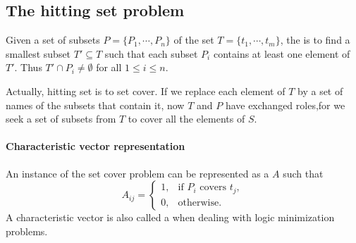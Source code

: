 \documentclass{note}
\begin{document}
\subsection{The hitting set problem}
\begin{definition}
Given a set of subsets $P = \{P_1, \cdots, P_n\}$ of the
set $T = \{t_1, \cdots, t_m\}$, the  is
to find a smallest subset $T' \subseteq T$ such that each subset
$P_i$ contains at least one element of $T'$.
Thus $T' \cap P_i \ne \emptyset$ for all $1 \le i \le n$.
\end{definition}
Actually, hitting set is  to set cover.
If we replace each element of $T$ by a set of names of the subsets that
contain it,
now $T$ and $P$ have exchanged roles,for we seek a set of subsets from
$T$ to cover all the elements of $S$.


\paragraph{Characteristic vector representation}
An instance of the set cover problem can be represented as
a  $A$ such that
\[ A_{ij} = \left\{\begin{array}{ll}
  1, & \mbox{if\ } P_i \mbox{\ covers\ } t_j, \\
  0, & \mbox{otherwise}.
  		   \end{array}\right. \]
A characteristic vector is also called a 
when dealing with logic minimization problems.
\end{document}
